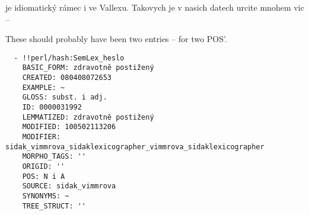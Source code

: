  je idiomatický rámec i ve Vallexu. Takovych je v nasich datech urcite mnohem vic -- 
\medskip

These should probably have been two entries -- for two POS'. 
\begin{verbatim}
  - !!perl/hash:SemLex_heslo
    BASIC_FORM: zdravotně postižený
    CREATED: 080408072653
    EXAMPLE: ~
    GLOSS: subst. i adj.
    ID: 0000031992
    LEMMATIZED: zdravotně postižený
    MODIFIED: 100502113206
    MODIFIER: sidak_vimmrova_sidaklexicographer_vimmrova_sidaklexicographer
    MORPHO_TAGS: ''
    ORIGID: ''
    POS: N i A
    SOURCE: sidak_vimmrova
    SYNONYMS: ~
    TREE_STRUCT: ''  
    \end{verbatim}
